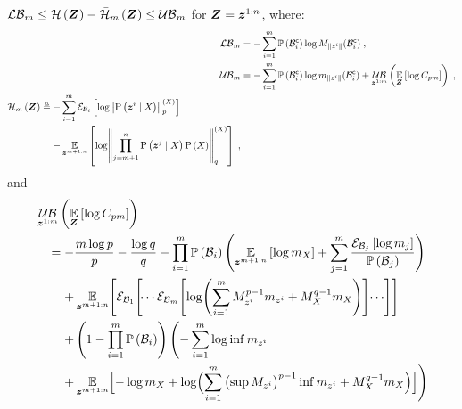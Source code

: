 \begin{propositionE}
	\label{thm:normalizer_bounds_struct}
	$\operatorname*{\mathcal{LB}}_m\leq\mathcal{H}\left({\boldsymbol Z_{}}\right) -\bar{\mathcal{H}}_{m}\left({\boldsymbol Z_{}}\right)\leq\operatorname*{\mathcal{UB}}_m$ for $\boldsymbol Z_{}=\boldsymbol z_{}^{1:n}$, where:
	\begin{subequations}
		\begin{align}
			\lowerbound\nolimits_m & =-\sum_{i=1}^m\measure{\stcompI{\subSpace}{i}}\log M_{\norm{\observation{}{i}}}(\stcompI{\subSpace}{i})\;, \\
			\upperbound\nolimits_m & =-\sum_{i=1}^m\measure{\stcompI{\subSpace}{i}}\log m_{\norm{\observation{}{i}}}(\stcompI{\subSpace}{i})+\upperbound_{\observationRV{}{1:m}}\left(\expectation{\log C_{pm}}{\observationsRV{}}\right)\;,\\
			\begin{split}
				\simplentropy{\observationsRV{}}{m} & \triangleq-\sum_{i=1}^m\partialexpectation{\log\pnorm{\probcond{\observationRV{}{i}}{\states{}}}{p}{\states{}}}{\subSpace_i}\\
				&\phantomeq-\expectation{\log\pnorm{\prod_{j=m+1}^n\probcond{\observationRV{}{j}}{\states{}}\prob{\states{}}}{q}{\states{}}}{\observationRV{}{m+1:n}}\;,
			\end{split}
		\end{align}
	\end{subequations}
	and
	\begin{equation}
		\begin{split}
			& \upperbound_{\observationRV{}{1:m}}\left(\expectation{\log C_{pm}}{\observationsRV{}}\right)\\
			& \quad=-\frac{m\log p}{p}-\frac{\log q}{q}
			-\prod_{i=1}^m\measure{\subSpace_i}\Biggl(\expectation{\log m_{\states{}}}{\observationRV{}{m+1:n}}+\sum_{j=1}^m\frac{\partialexpectation{\log m_j}{\subSpace_j}}{\measure{\subSpace_j}}\Biggr) \\
			& \quad\phantomeq+\E_{\observationRV{}{m+1:n}}\Biggl[\partexp_{\subSpace_1}\Biggl[\dotsi\partexp_{\subSpace_m}\Biggl[
			\log \Biggl(\sum_{i=1}^{m} M_{\observation{}{i}}^{p-1}m_{\observation{}{i}}
			+M_{\states{}}^{q-1}m_{\states{}}\Biggr)\Biggr]\dotsi\Biggr]\Biggr]\\
			& \quad\phantomeq+\left(1-\prod_{i=1}^m\measure{\subSpace_i}\right)\Biggl(-\sum_{i=1}^m\log \inf m_{\observation{}{i}}\\
			& \quad\phantomeq+\E_{\observationRV{}{m+1:n}}\Bigl[-\log m_{\states{}}
			+\log\Bigl(\sum_{i=1}^{m}\left(\sup M_{\observation{}{i}}\right)^{p-1}\inf m_{\observation{}{i}}+M_{\states{}}^{q-1}m_{\states{}}\Bigr)\Bigr]\Biggr)
		\end{split}
	\end{equation}
\end{propositionE}
